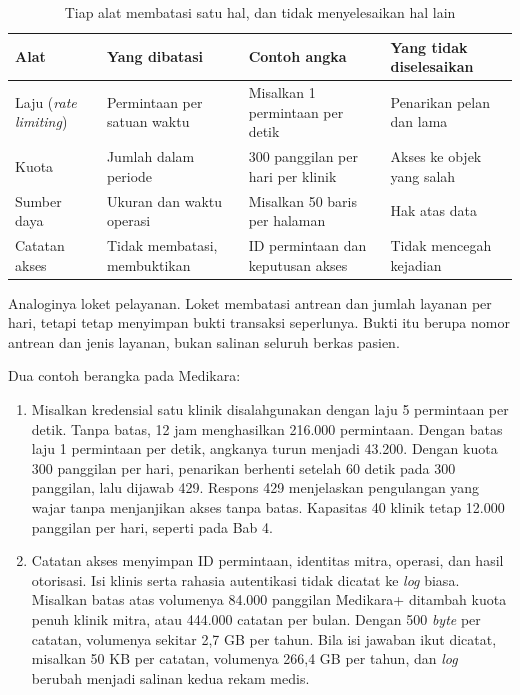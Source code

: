\begin{table}[!htb]
  \centering
  \caption{Tiap alat membatasi satu hal, dan tidak menyelesaikan hal lain}
  \label{tab:ch06-batas}
  \small
  \begin{tabularx}{\textwidth}{T{2.5cm}T{2.7cm}QQ}
    \hline
    \textbf{Alat} & \textbf{Yang dibatasi} & \textbf{Contoh angka} & \textbf{Yang tidak diselesaikan} \\ \hline
    Laju (\textit{rate limiting}) & Permintaan per satuan waktu & Misalkan 1 permintaan per detik & Penarikan pelan dan lama \\ \hline
    Kuota & Jumlah dalam periode & 300 panggilan per hari per klinik & Akses ke objek yang salah \\ \hline
    Sumber daya & Ukuran dan waktu operasi & Misalkan 50 baris per halaman & Hak atas data \\ \hline
    Catatan akses & Tidak membatasi, membuktikan & ID permintaan dan keputusan akses & Tidak mencegah kejadian \\ \hline
  \end{tabularx}
\end{table}

Analoginya loket pelayanan. Loket membatasi antrean dan jumlah layanan per hari, tetapi tetap menyimpan bukti transaksi seperlunya.
Bukti itu berupa nomor antrean dan jenis layanan, bukan salinan seluruh berkas pasien.

Dua contoh berangka pada Medikara:
\begin{enumerate}
  \item Misalkan kredensial satu klinik disalahgunakan dengan laju 5 permintaan per detik. Tanpa batas, 12 jam menghasilkan 216.000
        permintaan. Dengan batas laju 1 permintaan per detik, angkanya turun menjadi 43.200. Dengan kuota 300 panggilan per hari,
        penarikan berhenti setelah 60 detik pada 300 panggilan, lalu dijawab 429. Respons 429 menjelaskan pengulangan yang wajar
        tanpa menjanjikan akses tanpa batas. Kapasitas 40 klinik tetap 12.000 panggilan per hari, seperti pada Bab 4.
  \item Catatan akses menyimpan ID permintaan, identitas mitra, operasi, dan hasil otorisasi. Isi klinis serta rahasia autentikasi tidak
        dicatat ke \textit{log} biasa. Misalkan batas atas volumenya 84.000 panggilan Medikara+ ditambah kuota penuh klinik mitra, atau
        444.000 catatan per bulan. Dengan 500 \textit{byte} per catatan, volumenya sekitar 2,7 GB per tahun. Bila isi jawaban ikut dicatat,
        misalkan 50 KB per catatan, volumenya 266,4 GB per tahun, dan \textit{log} berubah menjadi salinan kedua rekam medis.
\end{enumerate}

